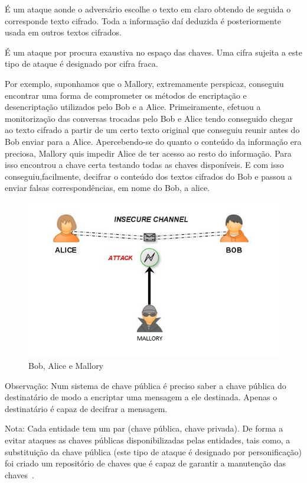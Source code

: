 \begin{definicao} É um ataque aonde o adversário escolhe o texto em claro obtendo de seguida o corresponde texto cifrado. Toda a informação daí deduzida é posteriormente usada em outros textos cifrados.
\end{definicao}

\begin{definicao}  É um ataque por procura exaustiva no espaço das chaves. Uma cifra sujeita a este tipo de ataque é designado por cifra fraca.
\end{definicao}


Por exemplo, suponhamos que o Mallory, extremamente perspicaz, conseguiu encontrar uma forma de comprometer os métodos de encriptação e desencriptação utilizados pelo Bob e a Alice. Primeiramente, efetuou a monitorização das conversas trocadas pelo Bob e Alice tendo conseguido chegar ao texto cifrado a partir de um certo texto original que conseguiu reunir antes do Bob enviar para a Alice. 
Apercebendo-se do quanto o conteúdo da informação era preciosa, Mallory quis impedir Alice de ter acesso ao resto do informação.
Para isso encontrou a chave certa testando todas as chaves disponíveis. E com isso conseguiu,facilmente, decifrar o conteúdo dos textos cifrados do Bob e passou a enviar falsas correspondências, em nome do Bob, a alice.
\begin{figure}[h]
    \centering
    \includegraphics[scale=0.5]{Figs/mallory.PNG}
    \caption{Bob, Alice e Mallory}
    \label{fig:bobalice}
\end{figure}

Observação: Num sistema de chave pública é preciso saber a chave pública do destinatário de modo a encriptar uma mensagem a ele destinada. Apenas o destinatário é capaz de decifrar a mensagem.

Nota: Cada entidade tem um par (chave pública, chave privada). De forma a evitar ataques as chaves públicas disponibilizadas pelas entidades, tais como, a substituição da chave pública (este tipo de ataque é designado por personificação) foi criado um repositório de chaves que é capaz de garantir a manutenção das chaves~\cite{Quaresma2009a}.

